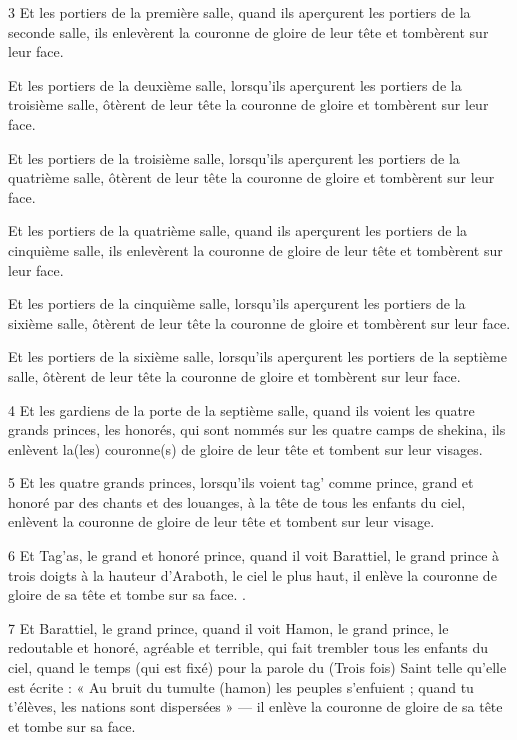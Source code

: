 \par 3 Et les portiers de la première salle, quand ils aperçurent les portiers de la seconde salle, ils enlevèrent la couronne de gloire de leur tête et tombèrent sur leur face.

\par Et les portiers de la deuxième salle, lorsqu'ils aperçurent les portiers de la troisième salle, ôtèrent de leur tête la couronne de gloire et tombèrent sur leur face.

\par Et les portiers de la troisième salle, lorsqu'ils aperçurent les portiers de la quatrième salle, ôtèrent de leur tête la couronne de gloire et tombèrent sur leur face.

\par Et les portiers de la quatrième salle, quand ils aperçurent les portiers de la cinquième salle, ils enlevèrent la couronne de gloire de leur tête et tombèrent sur leur face.

\par Et les portiers de la cinquième salle, lorsqu'ils aperçurent les portiers de la sixième salle, ôtèrent de leur tête la couronne de gloire et tombèrent sur leur face.

\par Et les portiers de la sixième salle, lorsqu'ils aperçurent les portiers de la septième salle, ôtèrent de leur tête la couronne de gloire et tombèrent sur leur face.

\par 4 Et les gardiens de la porte de la septième salle, quand ils voient les quatre grands princes, les honorés, qui sont nommés sur les quatre camps de shekina, ils enlèvent la(les) couronne(s) de gloire de leur tête et tombent sur leur visages.

\par 5 Et les quatre grands princes, lorsqu'ils voient tag' comme prince, grand et honoré par des chants et des louanges, à la tête de tous les enfants du ciel, enlèvent la couronne de gloire de leur tête et tombent sur leur visage.

\par 6 Et Tag'as, le grand et honoré prince, quand il voit Barattiel, le grand prince à trois doigts à la hauteur d'Araboth, le ciel le plus haut, il enlève la couronne de gloire de sa tête et tombe sur sa face. .

\par 7 Et Barattiel, le grand prince, quand il voit Hamon, le grand prince, le redoutable et honoré, agréable et terrible, qui fait trembler tous les enfants du ciel, quand le temps (qui est fixé) pour la parole du (Trois fois) Saint telle qu'elle est écrite : « Au bruit du tumulte (hamon) les peuples s'enfuient ; quand tu t'élèves, les nations sont dispersées » — il enlève la couronne de gloire de sa tête et tombe sur sa face.

